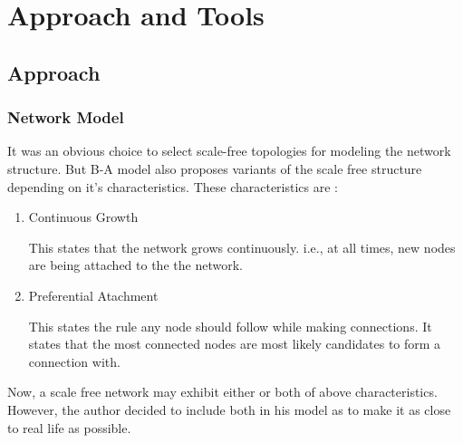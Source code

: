 
\chapter{Approach and Tools} %

\label{Chapter2} %



\section{Approach}

\subsection{Network Model}
It was an obvious choice to select scale-free topologies for modeling the network structure.  But B-A model also proposes variants of the scale free structure depending on it's characteristics. These characteristics are : 

\begin{enumerate}
\item Continuous Growth 

This states that the network grows continuously. i.e., at all times, new nodes are being attached to the the network.


\item Preferential Atachment

This states the rule any node should follow while making connections. It states that the most connected nodes are most likely candidates to form a connection with.


\end{enumerate} 

Now, a scale free network may exhibit either or both of above characteristics. However, the author decided to include both in his model as to make it as close to real life as possible. 

